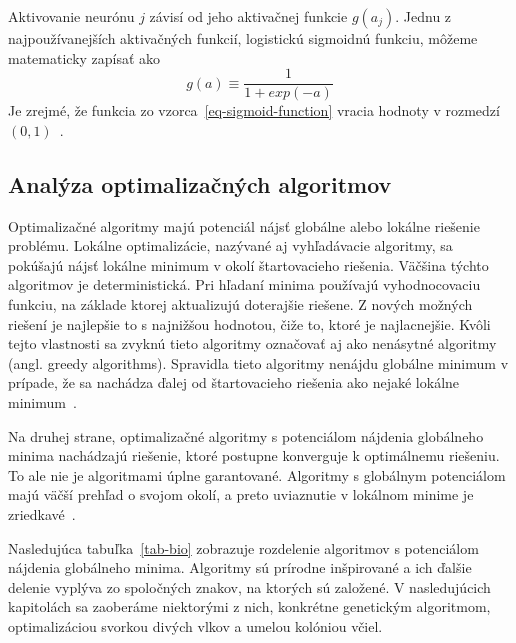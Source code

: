 \documentclass[a4paper,slovak,12pt,appendix]{article}
\begin{document}
Aktivovanie neurónu $j$ závisí od jeho aktivačnej funkcie $g(a_j)$. Jednu
z najpoužívanejších aktivačných funkcií, logistickú sigmoidnú funkciu, môžeme
matematicky zapísať ako
\begin{equation}
  g(a) \equiv \frac{1}{1 + exp(-a)}
  \label{eq-sigmoid-function}
\end{equation}
Je zrejmé, že funkcia zo vzorca~\ref{eq-sigmoid-function} vracia hodnoty
v rozmedzí $(0,1)$~\cite{Merz1998}.


\subsection{Analýza optimalizačných algoritmov}
Optimalizačné algoritmy majú potenciál nájsť globálne alebo lokálne
riešenie problému. Lokálne optimalizácie, nazývané aj vyhľadávacie algoritmy,
sa pokúšajú nájsť lokálne minimum v okolí štartovacieho riešenia. Väčšina
týchto algoritmov je deterministická. Pri hľadaní minima používajú
vyhodnocovaciu funkciu, na základe ktorej aktualizujú doterajšie riešene.
Z nových možných riešení je najlepšie to s najnižšou hodnotou, čiže to, ktoré
je najlacnejšie. Kvôli tejto vlastnosti sa zvyknú tieto algoritmy označovať aj
ako nenásytné algoritmy (angl. greedy algorithms). Spravidla tieto algoritmy nenájdu
globálne minimum v prípade, že sa nachádza ďalej od štartovacieho riešenia ako
nejaké lokálne minimum~\cite{Sen1995}.

Na druhej strane, optimalizačné algoritmy s potenciálom nájdenia globálneho
minima nachádzajú riešenie, ktoré postupne konverguje k optimálnemu riešeniu.
To ale nie je algoritmami úplne garantované. Algoritmy s globálnym
potenciálom majú väčší prehľad o svojom okolí, a preto uviaznutie v lokálnom
minime je zriedkavé~\cite{Sen1995}.

Nasledujúca tabuľka~\ref{tab-bio} zobrazuje rozdelenie algoritmov
s potenciálom nájdenia globálneho minima. Algoritmy sú prírodne inšpirované
a ich ďalšie delenie vyplýva zo spoločných znakov, na ktorých sú založené.
V nasledujúcich kapitolách sa zaoberáme niektorými z nich, konkrétne
genetickým algoritmom, optimalizáciou svorkou divých vlkov a umelou kolóniou včiel.
\end{document}
